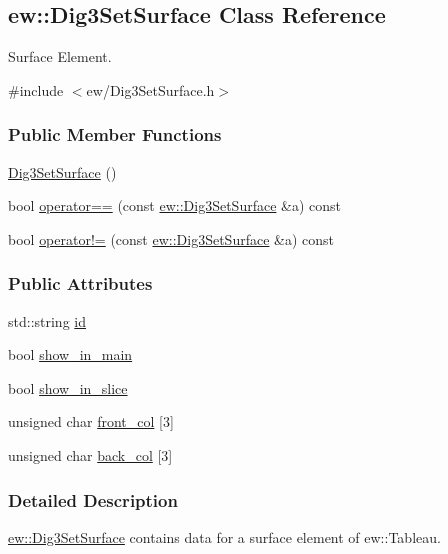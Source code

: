 \hypertarget{classew_1_1Dig3SetSurface}{
\subsection{ew::Dig3SetSurface Class Reference}
\label{classew_1_1Dig3SetSurface}
}


Surface Element.  




{\ttfamily \#include $<$ew/Dig3SetSurface.h$>$}

\subsubsection*{Public Member Functions}
\begin{DoxyCompactItemize}
\item 
\hyperlink{classew_1_1Dig3SetSurface_a426b3d9fa1363915d4c0972bb80d5636}{Dig3SetSurface} ()
\item 
bool \hyperlink{classew_1_1Dig3SetSurface_af4111aad020b0af73f43356dff480d24}{operator==} (const \hyperlink{classew_1_1Dig3SetSurface}{ew::Dig3SetSurface} \&a) const 
\item 
bool \hyperlink{classew_1_1Dig3SetSurface_aba2c063ee81653fc9e7872f5bfba747e}{operator!=} (const \hyperlink{classew_1_1Dig3SetSurface}{ew::Dig3SetSurface} \&a) const 
\end{DoxyCompactItemize}
\subsubsection*{Public Attributes}
\begin{DoxyCompactItemize}
\item 
std::string \hyperlink{classew_1_1Dig3SetSurface_aef9a8a1de88c69d590443a7fabb16f7c}{id}
\item 
bool \hyperlink{classew_1_1Dig3SetSurface_ad71bb9c721004e888f70c89d90fd6016}{show\_\-in\_\-main}
\item 
bool \hyperlink{classew_1_1Dig3SetSurface_a11a98c149d5f62f0d5c3b2230be82dfa}{show\_\-in\_\-slice}
\item 
unsigned char \hyperlink{classew_1_1Dig3SetSurface_aa067f664f7409bdab4f31a2facfc981d}{front\_\-col} \mbox{[}3\mbox{]}
\item 
unsigned char \hyperlink{classew_1_1Dig3SetSurface_ab5bb87bc9fb4bbf52dde7106f3cc4be1}{back\_\-col} \mbox{[}3\mbox{]}
\end{DoxyCompactItemize}


\subsubsection{Detailed Description}
\hyperlink{classew_1_1Dig3SetSurface}{ew::Dig3SetSurface} contains data for a surface element of ew::Tableau.

